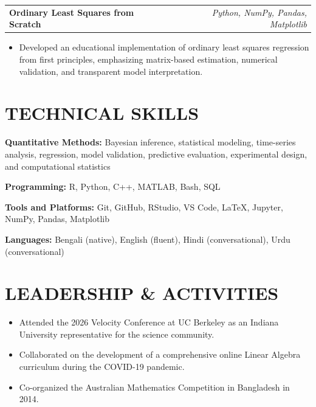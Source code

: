 \documentclass[10pt,letterpaper]{article}
\makeatletter
\newcommand{\projectEntry}[2]{%
  \begin{tabularx}{\textwidth}{@{}Xr@{}}
    \textbf{#1} & \textit{#2}
  \end{tabularx}%
}
\newenvironment{resumeItems}{%
  \begin{itemize}[
    label=\textbullet,
    leftmargin=14pt,
    labelsep=5pt,
    itemsep=0.5pt,
    topsep=1.0pt,
    parsep=0pt,
    partopsep=0pt
  ]
}{%
  \end{itemize}
}
\makeatother
\begin{document}
\vspace{0.7pt}

\projectEntry
  {Ordinary Least Squares from Scratch}
  {Python, NumPy, Pandas, Matplotlib}

\begin{resumeItems}
  \item Developed an educational implementation of ordinary least squares regression from first principles, emphasizing matrix-based estimation, numerical validation, and transparent model interpretation.
\end{resumeItems}

\section*{TECHNICAL SKILLS}

\textbf{Quantitative Methods:}
Bayesian inference, statistical modeling, time-series analysis, regression, model validation, predictive evaluation, experimental design, and computational statistics

\textbf{Programming:}
R, Python, C++, MATLAB, Bash, SQL

\textbf{Tools and Platforms:}
Git, GitHub, RStudio, VS Code, LaTeX, Jupyter, NumPy, Pandas, Matplotlib

\textbf{Languages:}
Bengali (native), English (fluent), Hindi (conversational), Urdu (conversational)

\section*{LEADERSHIP \& ACTIVITIES}

\begin{resumeItems}
  \item Attended the 2026 Velocity Conference at UC Berkeley as an Indiana University representative for the science community.

  \item Collaborated on the development of a comprehensive online Linear Algebra curriculum during the COVID-19 pandemic.

  \item Co-organized the Australian Mathematics Competition in Bangladesh in 2014.
\end{resumeItems}
\end{document}
